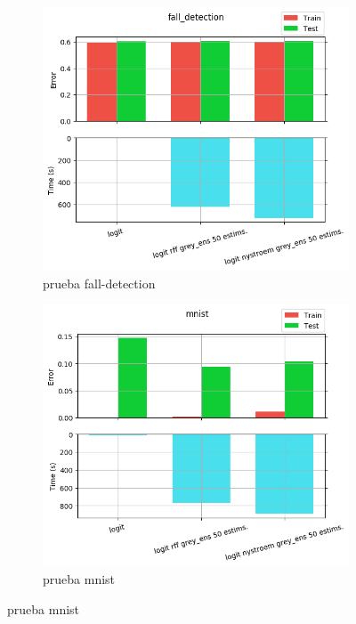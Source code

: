 \begin{figure}[ht]
  \centering
  \begin{subfigure}[b]{0.5\linewidth}
    \centering\captionsetup{width=.8\linewidth}\includegraphics[width=\imgscale\linewidth]{Figures/2_4/fall_detection}
    \caption{prueba fall-detection}
    \label{fig:2_4_fall_detection}
  \end{subfigure}%
  \begin{subfigure}[b]{0.5\linewidth}
    \centering\captionsetup{width=.8\linewidth}\includegraphics[width=\imgscale\linewidth]{Figures/2_4/mnist}
    \caption{prueba mnist}
    \label{fig:2_4_mnist}
  \end{subfigure}
\end{figure}


